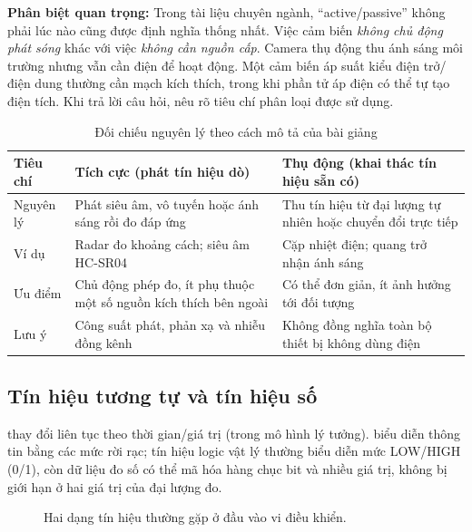 \begin{notebox}
\textbf{Phân biệt quan trọng:} Trong tài liệu chuyên ngành, ``active/passive'' không phải lúc nào cũng được định nghĩa thống nhất. Việc cảm biến \emph{không chủ động phát sóng} khác với việc \emph{không cần nguồn cấp}. Camera thụ động thu ánh sáng môi trường nhưng vẫn cần điện để hoạt động. Một cảm biến áp suất kiểu điện trở/điện dung thường cần mạch kích thích, trong khi phần tử áp điện có thể tự tạo điện tích. Khi trả lời câu hỏi, nêu rõ tiêu chí phân loại được sử dụng.
\end{notebox}

\begin{table}[htbp]\centering\small
\caption{Đối chiếu nguyên lý theo cách mô tả của bài giảng}
\begin{tabularx}{\textwidth}{p{31mm}XX}
\toprule
Tiêu chí & Tích cực (phát tín hiệu dò) & Thụ động (khai thác tín hiệu sẵn có)\\\midrule
Nguyên lý & Phát siêu âm, vô tuyến hoặc ánh sáng rồi đo đáp ứng & Thu tín hiệu từ đại lượng tự nhiên hoặc chuyển đổi trực tiếp\\
Ví dụ & Radar đo khoảng cách; siêu âm HC-SR04 & Cặp nhiệt điện; quang trở nhận ánh sáng\\
Ưu điểm & Chủ động phép đo, ít phụ thuộc một số nguồn kích thích bên ngoài & Có thể đơn giản, ít ảnh hưởng tới đối tượng\\
Lưu ý & Công suất phát, phản xạ và nhiễu đồng kênh & Không đồng nghĩa toàn bộ thiết bị không dùng điện\\\bottomrule
\end{tabularx}
\end{table}

\subsection{Tín hiệu tương tự và tín hiệu số}
 thay đổi liên tục theo thời gian/giá trị (trong mô hình lý tưởng).  biểu diễn thông tin bằng các mức rời rạc; tín hiệu logic vật lý thường biểu diễn mức LOW/HIGH (0/1), còn dữ liệu đo số có thể mã hóa hàng chục bit và nhiều giá trị, không bị giới hạn ở hai giá trị của đại lượng đo.

\begin{figure}[htbp]\centering
{}
\caption{Hai dạng tín hiệu thường gặp ở đầu vào vi điều khiển.}
\end{figure}

